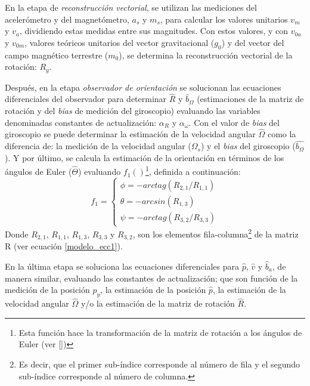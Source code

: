 \documentclass[10pt]{report}
\numberwithin{equation}{chapter}
\numberwithin{algorithm}{chapter}
\newcommand{\bcite}[1]{[\cite{#1}]}
\newcommand{\bias}{\emph{bias} }
\begin{document}
En la etapa de \emph{reconstrucción vectorial}, se utilizan las mediciones del acelerómetro y del magnetómetro, $a_s$ y $m_s$, para calcular los valores unitarios $v_m$ y $v_a$, dividiendo estas medidas entre sus magnitudes. Con estos valores, y con $v_{0a}$ y $v_{0m}$, valores teóricos unitarios del vector gravitacional ($g_0$) y del vector del campo magnético terrestre ($m_0$), se determina la reconstrucción vectorial de la rotación: $R_y$.\par
Después, en la etapa \emph{observador de orientación} se solucionan las ecuaciones diferenciales del observador para determinar $\hat{R}$ y $\hat{b}_\Omega$ (estimaciones de la matriz de rotación y del \emph{bias} de medición del giroscopio) evaluando las variables denominadas constantes de actualización: $\alpha_R$ y $\alpha_\omega$. Con el valor de \bias del giroscopio se puede determinar la estimación de la velocidad angular $\hat{\Omega}$ como la diferencia de: la medición de la velocidad angular ($\Omega_s$) y el \bias del giroscopio ($\hat{b_\Omega}$). Y por último, se calcula la estimación de la orientación en términos de los ángulos de Euler ($\hat{\Theta}$) evaluando $f_1()$\footnote{Esta función hace la transformación de la matriz de rotación a los ángulos de Euler (ver \bcite{Zhong2002})}, definida a continuación:
\begin{equation}\label{FuncionInversaEuler}
f_1=\left\{
\begin{array}{l}
\phi=-arctag(R_{2,1}/R_{1,1})\\
\theta=-arcsin(R_{1,3})\\
\psi=-arctag(R_{3,2}/R_{3,3})
\end{array}\right.
\end{equation}
Donde $R_{2,1}$, $R_{1,1}$, $R_{1,3}$, $R_{3,3}$ y $R_{3,2}$, son los elementos fila-columna\footnote{Es decir, que el primer sub-índice corresponde al número de fila y el segundo sub-índice corresponde al número de columna.} de la matriz R (ver ecuación \eqref{modelo_ecc1}).\par
En la última etapa se soluciona las ecuaciones diferenciales para $\hat{p}$, $\hat{v}$ y $\hat{b}_a$, de manera similar, evaluando las constantes de actualización; que son función de la medición de la posición $p_y$, la estimación de la posición $\hat{p}$, la estimación de la velocidad angular $\hat{\Omega}$ y/o la estimación de la matriz de rotación $\hat{R}$.\par
\end{document}
